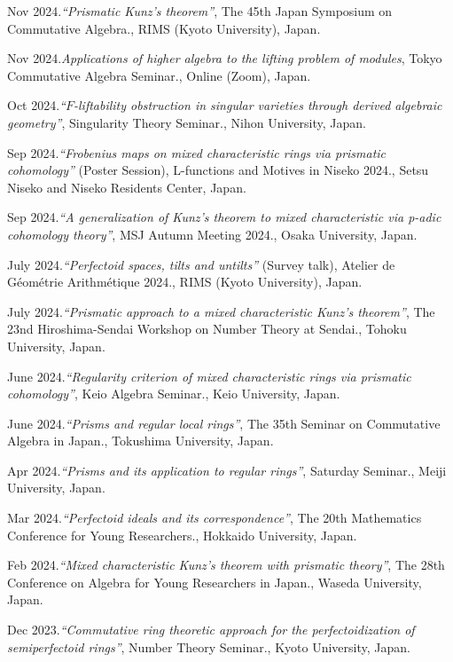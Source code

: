 \documentclass[10pt,a4paper,sans]{moderncv}
\begin{document}
\begin{etaremune}
  \item Nov 2024.\emph{``Prismatic Kunz's theorem''}, \textsf{The 45th Japan Symposium on Commutative Algebra.}, RIMS (Kyoto University), Japan.
  \item Nov 2024.\emph{Applications of higher algebra to the lifting problem of modules}, \textsf{Tokyo Commutative Algebra Seminar.}, Online (Zoom), Japan.
  \item Oct 2024.\emph{``\(F\)-liftability obstruction in singular varieties through derived algebraic geometry''}, \textsf{Singularity Theory Seminar.}, Nihon University, Japan.
  \item Sep 2024.\emph{``Frobenius maps on mixed characteristic rings via prismatic cohomology''} (Poster Session), \textsf{L-functions and Motives in Niseko 2024.}, Setsu Niseko and Niseko Residents Center, Japan.
  \item Sep 2024.\emph{``A generalization of Kunz's theorem to mixed characteristic via p-adic cohomology theory''}, \textsf{MSJ Autumn Meeting 2024.}, Osaka University, Japan.
  \item July 2024.\emph{``Perfectoid spaces, tilts and untilts''} (Survey talk), \textsf{Atelier de Géométrie Arithmétique 2024.}, RIMS (Kyoto University), Japan.
  \item July 2024.\emph{``Prismatic approach to a mixed characteristic Kunz's theorem''}, \textsf{The 23nd Hiroshima-Sendai Workshop on Number Theory at Sendai.}, Tohoku University, Japan.
  \item June 2024.\emph{``Regularity criterion of mixed characteristic rings via prismatic cohomology''}, \textsf{Keio Algebra Seminar.}, Keio University, Japan.
  \item June 2024.\emph{``Prisms and regular local rings''}, \textsf{The 35th Seminar on Commutative Algebra in Japan.}, Tokushima University, Japan.
  \item Apr 2024.\emph{``Prisms and its application to regular rings''}, \textsf{Saturday Seminar.}, Meiji University, Japan.
  \item Mar 2024.\emph{``Perfectoid ideals and its correspondence''}, \textsf{The 20th Mathematics Conference for Young Researchers.}, Hokkaido University, Japan.
  \item Feb 2024.\emph{``Mixed characteristic Kunz's theorem with prismatic theory''}, \textsf{The 28th Conference on Algebra for Young Researchers in Japan.}, Waseda University, Japan.
  \item Dec 2023.\emph{``Commutative ring theoretic approach for the perfectoidization of semiperfectoid rings''}, \textsf{Number Theory Seminar.}, Kyoto University, Japan.

\end{etaremune}
\end{document}
